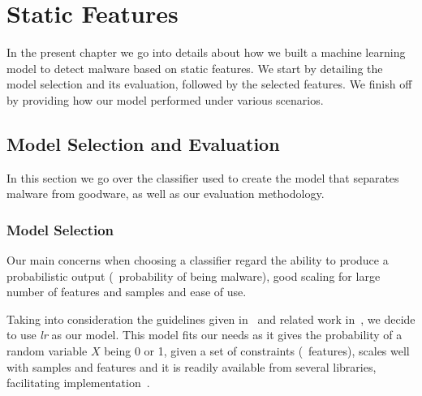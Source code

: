 
\chapter{Static Features}
\label{chapter:static_features}

In the present chapter we go into details about how we built a machine learning model to detect malware based on static features.
We start by detailing the model selection and its evaluation, followed by the selected features.
We finish off by providing how our model performed under various scenarios.

\section{Model Selection and Evaluation}
\label{section:model_selection_evaluation}

In this section we go over the classifier used to create the model that separates malware from goodware, as well as our evaluation methodology.

\subsection{Model Selection}
\label{section:model_selection}

Our main concerns when choosing a classifier regard the ability to produce a probabilistic output (\ie\ probability of being malware), good scaling for large number of features and samples and ease of use.

Taking into consideration the guidelines given in~\cite{rossow:practices,shabtai:survey} and related work in~\cite{miller:rev_int,nissim:al_pdf,rieck:dynamic,schultz:data_mining}, we decide to use \textit{\acrfull{lr}} as our model.
This model fits our needs as it gives the probability of a random variable $X$ being 0 or 1, given a set of constraints (\ie~features), scales well with samples and features and it is readily available from several libraries, facilitating implementation~\cite{friedman2001elements}.

